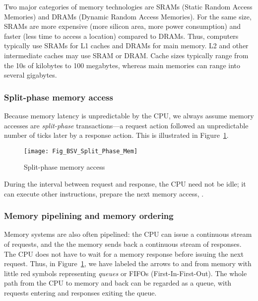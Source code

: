 
Two major categories of memory technologies are SRAMs (Static Random
Access Memories) and DRAMs (Dynamic Random Access Memories).  For the
same size, SRAMs are more expensive (more silicon area, more power
consumption) and faster (less time to access a location) compared to
DRAMs.  Thus, computers typically use SRAMs for L1 caches and DRAMs
for main memory. L2 and other intermediate caches may use SRAM or
DRAM.  Cache sizes typically range from the 10s of kilobytes to 100
megabytes, whereas main memories can range into several gigabytes.


\subsubsection{Split-phase memory access}



Because memory latency is unpredictable by the CPU, we always assume
memory accesses are \emph{split-phase} transactions---a request action
followed an unpredictable number of ticks later by a response action.
This is illustrated in Figure~\ref{Fig_BSV_Split_Phase_Mem}.
\begin{figure}[htbp]
  \centerline{\texttt{[image: Fig\_BSV\_Split\_Phase\_Mem]}}
  \caption{\label{Fig_BSV_Split_Phase_Mem} Split-phase memory access}
\end{figure}
During the interval between request and response, the CPU need not be
idle; it can execute other instructions, prepare the next memory
access, {\etc}.


\subsubsection{Memory pipelining and memory ordering}

Memory systems are also often pipelined: the CPU can issue a
continuous stream of requests, and the the memory sends back a
continuous stream of responses.  The CPU does not have to wait for a
memory response before issuing the next request.  Thus, in
Figure~\ref{Fig_BSV_Split_Phase_Mem}, we have labeled the arrows to
and from memory with little red symbols representing \emph{queues} or
FIFOs (First-In-First-Out).  The whole path from the CPU to memory and
back can be regarded as a queue, with requests entering and responses
exiting the queue.

